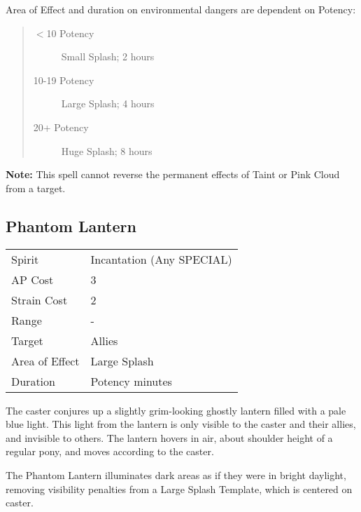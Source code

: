\documentclass[11pt,a4paper,twocolumn]{book}
\begin{document}
\newpage

Area of Effect and duration on environmental dangers are dependent on Potency:

\begin{quote}
	\begin{description}
		\item[$<$10 Potency] 	Small Splash; 2 hours
		\item[10-19 Potency] 	Large Splash; 4 hours
		\item[20+ Potency]  	Huge Splash; 8 hours
	\end{description}	
\end{quote}

\textbf{Note:} This spell cannot reverse the permanent effects of Taint or Pink Cloud from a target.

\subsection*{Phantom Lantern}
{
	\begin{tabu} to 75mm{| X[l,4] | X[l,7] |}
		\hline
		Spirit         & Incantation (Any SPECIAL) \\
		AP Cost        & 3                         \\
		Strain Cost    & 2                         \\
		Range          & -                         \\
		Target         & Allies                    \\
		Area of Effect & Large Splash              \\
		Duration       & Potency minutes           \\ \hline
	\end{tabu}
	
}

\medskip

The caster conjures up a slightly grim-looking ghostly lantern filled with a pale blue light. This light from the lantern is only visible to the caster and their allies, and invisible to others. The lantern hovers in air, about shoulder height of a regular pony, and moves according to the caster.

The Phantom Lantern illuminates dark areas as if they were in bright daylight, removing visibility penalties from a Large Splash Template, which is centered on caster.
\end{document}
